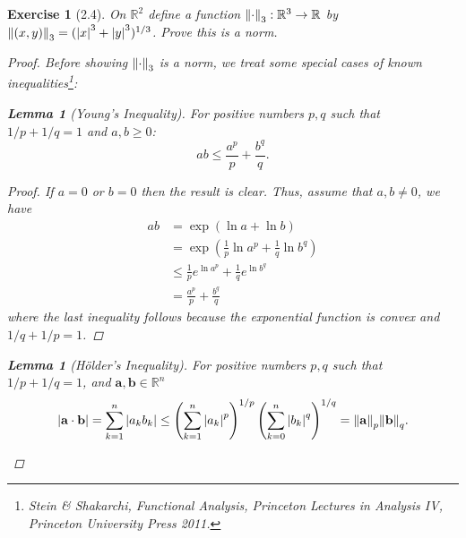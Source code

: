\documentclass[11pt]{article}
\newtheorem{lemma}[theorem]{Lemma}
\newtheorem{exercise}{Exercise}
\newcommand*{\myproofname}{Proof}
\newenvironment{subproof}[1][\myproofname]{\begin{proof}[#1]\renewcommand*{\qedsymbol}{$\mathbin{/\mkern-6mu/}$}}{\end{proof}}
\newcommand{\R}{\mathbb{R}}
\newcommand{\lp}{\left(}
\newcommand{\rp}{\right)}
\newcommand{\f}[2]{\frac{#1}{#2}}
\begin{document}
\begin{exercise}[2.4]
	On $\mathbb{R}^2$ define a function $\norm{\cdot}_3 : \R^3 \to \R$ by $\norm{(x,y)}_3 = (\abs{x}^3 + \abs{y}^3)^{1/3}$. Prove this is a norm.
	
	\begin{proof}
		Before showing $\norm{\cdot}_3$ is a norm, we treat some special cases of known inequalities\footnote{Stein \& Shakarchi, \textit{Functional Analysis, Princeton Lectures in Analysis IV}, Princeton University Press 2011.}:
		\begin{lemma}[Young's Inequality]
			For positive numbers $p,q$ such that $1/p + 1/q = 1$ and $a,b \geq 0$:
			\begin{equation*}
			ab \leq \f{a^p}{p} + \f{b^q}{q}.
			\end{equation*}
			
			\begin{subproof}
				If $a=0$ or $b=0$ then the result is clear. Thus, assume that $a,b\neq 0$, we have
				\begin{align*}
				ab &= \exp\lp\ln a + \ln b\rp \\ 
				&= \exp\lp\f{1}{p} \ln a^p + \f{1}{q} \ln b^q\rp\\
				&\leq \f{1}{p}e^{\ln a^p} + \f{1}{q}e^{\ln b^q} \\
				&= \f{a^p}{p} + \f{b^q}{q} 
				\end{align*}
				where the last inequality follows because the exponential function is convex and $1/q + 1/p = 1$.
			\end{subproof}
		\end{lemma}
		
		\begin{lemma}[H\"{o}lder's Inequality]
			For positive numbers $p,q$ such that $1/p + 1/q = 1$, and $\mathbf{a},\mathbf{b} \in \R^n$
			\begin{equation*}
			\abs{\bf{a}\cdot \bf{b}} = \sum^n_{k=1} \abs{a_k b_k} \leq \lp \sum^n_{k=1}\abs{a_k}^p \rp^{1/p} \lp \sum^n_{k=0} \abs{b_k}^q \rp^{1/q} = \norm{\bf{a}}_p \norm{\bf{b}}_q.
			\end{equation*}
			

\end{lemma}
\end{proof}
\end{exercise}
\end{document}
